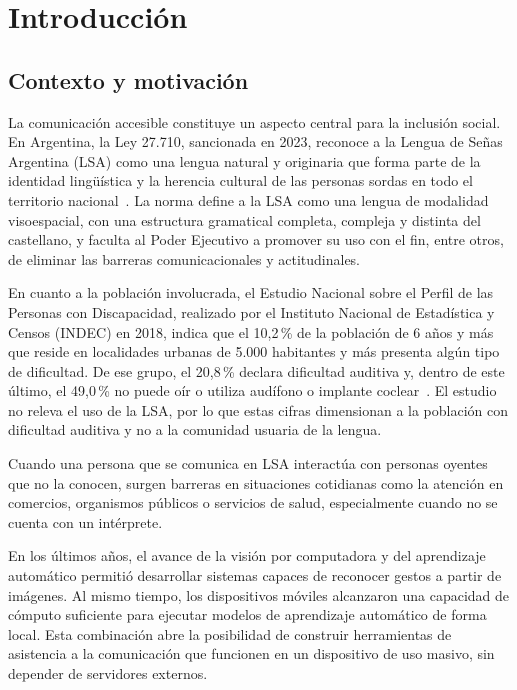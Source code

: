 \chapter{Introducción}

\section{Contexto y motivación}

La comunicación accesible constituye un aspecto central para la inclusión social. En Argentina, la Ley 27.710, sancionada en 2023, reconoce a la Lengua de Señas Argentina (LSA) como una lengua natural y originaria que forma parte de la identidad lingüística y la herencia cultural de las personas sordas en todo el territorio nacional~\cite{ley27710}. La norma define a la LSA como una lengua de modalidad visoespacial, con una estructura gramatical completa, compleja y distinta del castellano, y faculta al Poder Ejecutivo a promover su uso con el fin, entre otros, de eliminar las barreras comunicacionales y actitudinales.

En cuanto a la población involucrada, el Estudio Nacional sobre el Perfil de las Personas con Discapacidad, realizado por el Instituto Nacional de Estadística y Censos (INDEC) en 2018, indica que el 10,2\,\% de la población de 6 años y más que reside en localidades urbanas de 5.000 habitantes y más presenta algún tipo de dificultad. De ese grupo, el 20,8\,\% declara dificultad auditiva y, dentro de este último, el 49,0\,\% no puede oír o utiliza audífono o implante coclear~\cite{indec2018}. El estudio no releva el uso de la LSA, por lo que estas cifras dimensionan a la población con dificultad auditiva y no a la comunidad usuaria de la lengua.

Cuando una persona que se comunica en LSA interactúa con personas oyentes que no la conocen, surgen barreras en situaciones cotidianas como la atención en comercios, organismos públicos o servicios de salud, especialmente cuando no se cuenta con un intérprete.

En los últimos años, el avance de la visión por computadora y del aprendizaje automático permitió desarrollar sistemas capaces de reconocer gestos a partir de imágenes. Al mismo tiempo, los dispositivos móviles alcanzaron una capacidad de cómputo suficiente para ejecutar modelos de aprendizaje automático de forma local. Esta combinación abre la posibilidad de construir herramientas de asistencia a la comunicación que funcionen en un dispositivo de uso masivo, sin depender de servidores externos.

